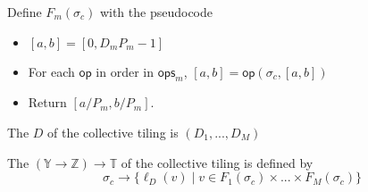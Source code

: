 \filbreak
Define $F_m(\sigma_c)$ with the pseudocode
\begin{itemize}
  \item $[a, b] = [0, D_mP_m-1]$
  \item For each $\mathsf{op}$ in order in $\mathsf{ops}_m$, $[a, b] = \mathsf{op}(\sigma_c, [a, b])$
  \item Return $[a / P_m, b / P_m]$.
\end{itemize}

\filbreak
The  $D$ of the collective tiling is $(D_1, ..., D_M)$

The  $(\mathbb{Y} \to \mathbb{Z}) \to \mathbb{T}$ of the collective tiling is defined by
\begin{equation}
  \sigma_c \to \{ \ell_D(v) \mid v \in F_1(\sigma_c) \times ... \times F_M(\sigma_c) \}
\end{equation}

\filbreak
{}

\filbreak
{}

\filbreak
{}


